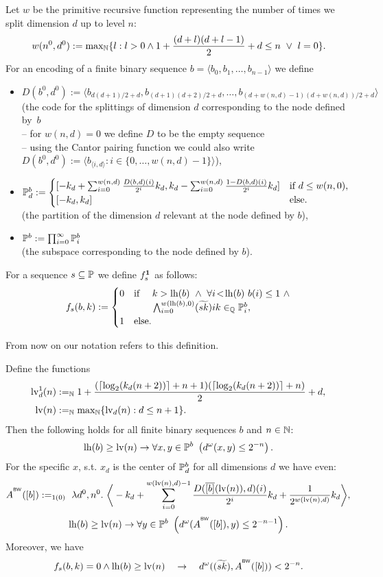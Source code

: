 \begin{dfn}\label{d:PPs}
Let $w$ be the primitive recursive function representing the number of times
we split dimension $d$ up to level $n$:
\[w(n^0,d^0):= {\max}{} _\NN\{l: l>0 \wedge 1+\frac{(d+l)(d+l-1)}{2}+d\leq n\ 
\vee\ l=0\}.\]
For an encoding of a finite binary sequence $b=\langle b_0,b_1,\ldots,b_{n-1} 
\rangle$ we define
\begin{itemize}
\item $D(b^0,d^0):=\langle b_{d(d+1)/2+d}, b_{(d+1)(d+2)/2+d}, \ldots, 
b_{(d+w(n,d)-1)(d+w(n,d))/2+d} \rangle$\\ (the code for the 
splittings of dimension $d$ corresponding to the node defined by~$b$\\ 
-- for $w(n,d)=0$ we define $D$ to be the empty sequence\\ 
-- using the Cantor pairing function we could also write $D(b^0,d^0):=\langle 
b_{\langle i,d\rangle}:i\in\{0,\ldots,w(n,d)-1\} \rangle$),
\item $\mathbb{P}^b_d:=\begin{cases}
[-k_d+\sum_{i=0}^{w(n,d)}\frac{D(b,d)(i)}{2^i}k_d, k_d-\sum_{i=0}^{w(n,d)}
\frac{1-D(b,d)(i)}{2^i}k_d]&\text{if}\ d\leq w(n,0),\\
[-k_d,k_d]&\text{else}.
\end{cases}$\\ (the partition
of the dimension $d$ relevant at the node defined by $b$),
\item $\mathbb{P}^b:=\prod_{i=0}^{\infty}\mathbb{P}^b_i$\\ (the subspace
corresponding to the node defined by $b$).
\end{itemize}
For a sequence $s\subseteq\mathbb{P}$ we define $f_s^\mathbf{1}$
as follows:
\[
f_s(b,k):=\begin{cases}
0&\Tif\quad\ k>\lh(b)\ \wedge\ \forall i\!<\!\lh(b)\ b(i)\leq1\ \wedge \\
&\quad\ \ \ \bigwedge_{i=0}^{w(\lh(b),0)} (\widetilde{sk})ik
\in_\QQ \PP^b_i , \\
1&\Telse.
\end{cases}
\]
\end{dfn}
From now on our notation refers to this definition.
\begin{lemma}\label{l:ldn}
\newcommand{\x}{\lceil\log_2(k_d(n+2))\rceil+n} %
Define the functions
\begin{align*}
\l_d^1(n)&:=_\NN1+\frac{(\x+1)(\x)}{2}+d,\\
\l(n)&:=_\NN{\max}{} _\NN\{ \l_d(n) : d\leq n+1\}.
\end{align*}
Then the following holds for all finite binary sequences $b$ and $n\in\mathbb{N}$:
\[
\lh(b)\geq \l(n)\rightarrow \forall x,y\in\PP^b\ \left( 
d^\omega(x,y)\leq2^{-n} \right).
\]
For the specific $x$, s.t. $x_d$ is the center of $\mathbb{P}^b_d$ for all 
dimensions $d$ we have even:
\[
A^{^\BW}([b]) :=_{1(0)}\ \lambda d^0,n^0.\ \bigg\langle   
-k_d+\sum_{i=0}^{w(\l(n),d)-1}\frac{D(\overline{[b]}
(\l(n)),d)(i)}{2^i}k_d  + \frac{1}{2^{w(\l(n),d)}}k_d\bigg\rangle,\]\[
\lh(b)\geq \l(n)\rightarrow \forall y\in\PP^b\ \left( 
d^\omega(A^{^\BW}([b]),y)\leq2^{-n-1} \right).
\]
Moreover, we have 
\[
f_s(b,k)=0 \wedge \operatorname{lh}(b)\geq \mathrm {lv}(n)\quad \rightarrow\quad d^\omega((\widetilde{sk}),A^{^{\textsf{\upshape BW}}}([b]))<2^{-n}.
\]
\end{lemma}
